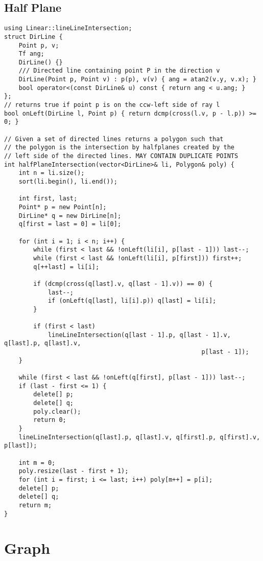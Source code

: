 \documentclass[FSZ,a4paper,onesided]{article}
\begin{document}
\begin{multicols*}{\COLS}
\subsection{Half Plane}
\begin{lstlisting}
using Linear::lineLineIntersection;
struct DirLine {
    Point p, v;
    Tf ang;
    DirLine() {}
    /// Directed line containing point P in the direction v
    DirLine(Point p, Point v) : p(p), v(v) { ang = atan2(v.y, v.x); }
    bool operator<(const DirLine& u) const { return ang < u.ang; }
};
// returns true if point p is on the ccw-left side of ray l
bool onLeft(DirLine l, Point p) { return dcmp(cross(l.v, p - l.p)) >= 0; }

// Given a set of directed lines returns a polygon such that
// the polygon is the intersection by halfplanes created by the
// left side of the directed lines. MAY CONTAIN DUPLICATE POINTS
int halfPlaneIntersection(vector<DirLine>& li, Polygon& poly) {
    int n = li.size();
    sort(li.begin(), li.end());

    int first, last;
    Point* p = new Point[n];
    DirLine* q = new DirLine[n];
    q[first = last = 0] = li[0];

    for (int i = 1; i < n; i++) {
        while (first < last && !onLeft(li[i], p[last - 1])) last--;
        while (first < last && !onLeft(li[i], p[first])) first++;
        q[++last] = li[i];

        if (dcmp(cross(q[last].v, q[last - 1].v)) == 0) {
            last--;
            if (onLeft(q[last], li[i].p)) q[last] = li[i];
        }

        if (first < last)
            lineLineIntersection(q[last - 1].p, q[last - 1].v, q[last].p, q[last].v,
                                                      p[last - 1]);
    }

    while (first < last && !onLeft(q[first], p[last - 1])) last--;
    if (last - first <= 1) {
        delete[] p;
        delete[] q;
        poly.clear();
        return 0;
    }
    lineLineIntersection(q[last].p, q[last].v, q[first].p, q[first].v, p[last]);

    int m = 0;
    poly.resize(last - first + 1);
    for (int i = first; i <= last; i++) poly[m++] = p[i];
    delete[] p;
    delete[] q;
    return m;
}
\end{lstlisting}
\section{Graph}

\end{multicols*}
\end{document}
